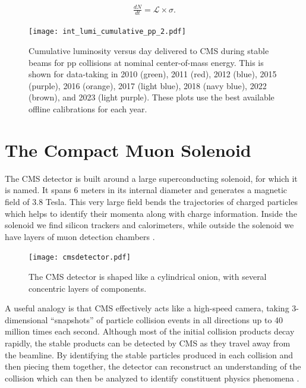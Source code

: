 \begin{equation}
\label{eq:crosssection}
\begin{gathered}
\frac{dN}{dt} = \mathcal{L} \times \sigma.
\end{gathered}
\end{equation}

\begin{figure}[!hbt]
\begin{center}
    \texttt{[image: int\_lumi\_cumulative\_pp\_2.pdf]}
    \caption{Cumulative luminosity versus day delivered to CMS during stable beams for pp collisions at nominal center-of-mass energy. This is shown for data-taking in 2010 (green), 2011 (red), 2012 (blue), 2015 (purple), 2016 (orange), 2017 (light blue), 2018 (navy blue), 2022 (brown), and 2023 (light purple). These plots use the best available offline calibrations for each year.}
    \label{fig:cmsintlumi}
\end{center}
\end{figure}

\section{The Compact Muon Solenoid} \label{chap:chap-3.2-CMS}
The CMS detector is built around a large superconducting solenoid, for which it is named. It spans 6 meters in its internal diameter and generates a magnetic field of 3.8 Tesla. This very large field bends the trajectories of charged particles which helps to identify their momenta along with charge information. Inside the solenoid we find silicon trackers and calorimeters, while outside the solenoid we have layers of muon detection chambers \cite{CMStechprop, The_CMS_Collaboration_2008, Contardo:2020886}.

\begin{figure}[!hbt]
\begin{center}
    \texttt{[image: cmsdetector.pdf]}
    \caption{The CMS detector is shaped like a cylindrical onion, with several concentric layers of components.}
    \label{fig:cmscutaway1}
\end{center}
\end{figure}

A useful analogy is that CMS effectively acts like a high-speed camera, taking 3-dimensional ``snapshots'' of particle collision events in all directions up to 40 million times each second. Although most of the initial collision products decay rapidly, the stable products can be detected by CMS as they travel away from the beamline. By identifying the stable particles produced in each collision and then piecing them together, the detector can reconstruct an understanding of the collision which can then be analyzed to identify constituent physics phenomena \cite{Karimaki:368412, CERN-LHCC-2000-016, Chatrchyan:1129810, Collaboration:2745805, CERN-LHCC-2017-009}.

